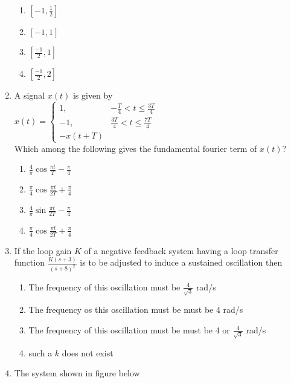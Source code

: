 \documentclass[journal,12pt,onecolumn]{IEEEtran}
\theoremstyle{remark}
\begin{document}
\begin{enumerate}
\begin{enumerate}
\item $[-1, \frac{1}{2}]$
\item $[-1, 1]$
\item $[\frac{-1}{2}, 1]$
\item $[\frac{-1}{2}, 2]$\\
\end{enumerate} 

\item A signal $x(t)$ is given by \\
$ x(t) = \begin{cases} 
1, & -\frac{T}{4} < t \leq \frac{3T}{4} \\
-1, & \frac{3T}{4} < t \leq \frac{7T}{4} \\
-x(t+T) 
\end{cases} $ \\

Which among the following gives the fundamental fourier term of $x(t)$? 
\begin{enumerate}
\item $\frac{4}{\pi} \cos{\frac{\pi t}{T}-\frac{\pi}{4}}$
\item $\frac{\pi}{4} \cos{\frac{\pi t}{2T}+\frac{\pi}{4}}$
\item $\frac{4}{\pi} \sin{\frac{\pi t}{2T}-\frac{\pi}{4}}$
\item $\frac{\pi}{4} \cos{\frac{\pi t}{2T}+\frac{\pi}{4}}$ \\
\end{enumerate}

\item If the loop gain $K$ of a negative feedback system having a loop transfer function $\frac{K(s+3)}{(s+8)^2}$ is to be adjusted to induce a sustained oscillation then 
\begin{enumerate}
\item The frequency of this oscillation must be $\frac{4}{\sqrt{3}}$ rad/s
\item The frequency os this oscillation must be must be 4 rad/s
\item The frequency of this oscillation must be must be 4 or $\frac{4}{\sqrt{3}}$ rad/s
\item such a $k$ does not exist \\
\end{enumerate}

\item The system shown in figure below 

\begin{figure}[!ht]
\centering
{}
\end{figure}
\end{enumerate}
\end{document}
